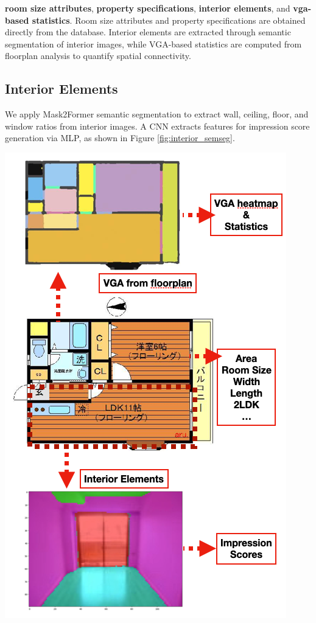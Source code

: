 \documentclass[11pt,a4paper]{article}
\begin{document}
\begin{multicols}{2}
\textbf{room size attributes}, \textbf{property specifications}, \textbf{interior elements}, and \textbf{vga-based statistics}.
Room size attributes and property specifications are obtained directly from the database.
Interior elements are extracted through semantic segmentation of interior images, 
while VGA-based statistics are computed from floorplan analysis to quantify spatial connectivity. 

\subsection{Interior Elements}
We apply Mask2Former semantic segmentation to extract wall, ceiling, floor, and window ratios from interior images. 
A CNN extracts features for impression score generation via MLP, as shown in Figure \ref{fig:interior_semseg}.
\begin{center}
    \includegraphics[width=0.8\columnwidth]{plots/overview_02.png}
    \label{fig:overview_02}
\end{center}


\end{multicols}
\end{document}
